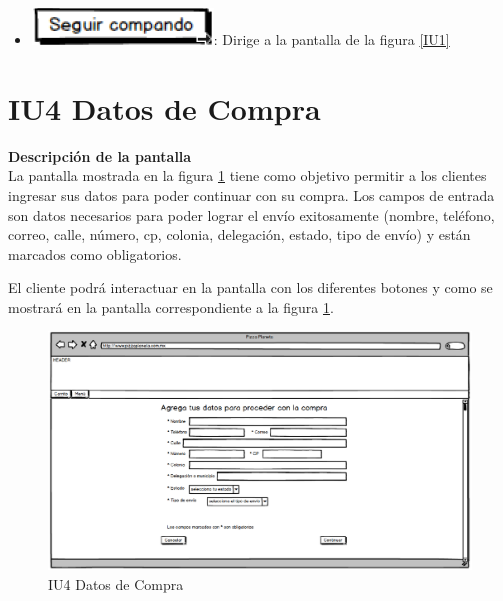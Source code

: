 \begin{itemize}
	\begin{itemize}
		
		\item \includegraphics[scale=0.500]{imagenes/iconografia/Seguir.png}: Dirige a la pantalla de la figura \ref{IU1}
		
	\end{itemize}

\end{itemize}

\hypertarget{IU1}{}
\section{IU4 Datos de Compra}

\noindent \textbf{Descripción de la pantalla}\\

La pantalla mostrada en la figura \ref{IU4} tiene como objetivo permitir a los clientes ingresar sus datos para poder continuar con su compra.
Los campos de entrada son datos necesarios para poder lograr el envío exitosamente (nombre, teléfono, correo, calle, número, cp, colonia, delegación, estado, tipo de envío) y están marcados como obligatorios.

El cliente podrá interactuar en la pantalla con los diferentes botones y  como se mostrará en la pantalla correspondiente a la figura \ref{IU4}.
\begin{figure}[h]
	
	\begin{center}				
		
		\includegraphics[scale=0.50]{./imagenes/IUs/RegistroSolicitantes/iu1-IniciarSesion/IU4-DatosDeCompra.png}
		\caption{IU4 Datos de Compra}
		\label{IU4}
		
	\end{center}
	
\end{figure}



